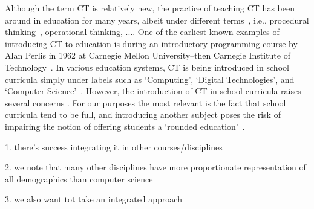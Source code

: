 \documentclass[manuscript,screen,review]{acmart}
\begin{document}

Although the term CT is relatively new, the practice of teaching CT has been around in education for many years, albeit under different terms~\cite{czerkawski2015exploring}, i.e., procedural thinking~\cite{papert1980mindstorms}, operational thinking, .... One of the earliest known examples of introducing CT to education is during an introductory programming course by Alan Perlis in 1962 at Carnegie Mellon University--then Carnegie Institute of Technology~\cite{perlis1962computer}. In various education systems, CT is being introduced in school curricula simply under labels such as `Computing', `Digital Technologies', and `Computer Science'~\cite{duncan2015pilot, heintz2016reviewofmodels, hubwieser2015global}. However, the introduction of CT in school curricula raises several concerns \cite{tatar2017protoCT}. For our purposes the most relevant is the fact that school curricula tend to be full, and introducing another subject poses the risk of impairing the notion of offering students a `rounded education'~\cite{bell2018integrating}.

1. there's success integrating it in other courses/disciplines

2. we note that many other disciplines have more proportionate representation of all demographics than computer science

3. we also want tot take an integrated approach


    
\end{document}
